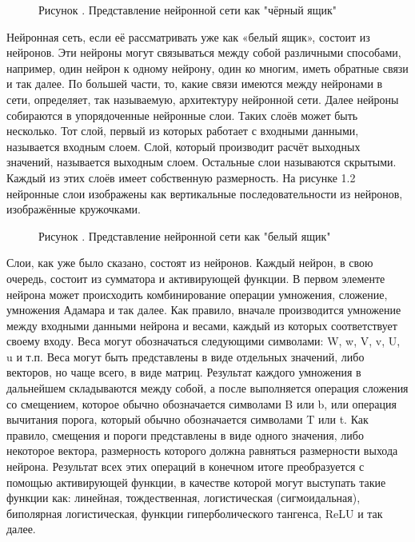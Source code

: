 {  \begin{figure}[H]
    \centering
    \def\svgwidth{\textwidth}
    
    \caption*{\gostFont Рисунок \thechaptercntr .\theimagecntr \spc {--} Представление нейронной сети как "чёрный ящик"}
    \label{fig:NNBlackBox}
  \end{figure} \addtocounter{imagecntr}{1}

  \par \redline Нейронная сеть, если её рассматривать уже как «белый ящик», состоит из нейронов. Эти нейроны могут связываться между собой различными способами, например, один нейрон к одному нейрону, один ко многим, иметь обратные связи и так далее. По большей части, то, какие связи имеются между нейронами в сети, определяет, так называемую, архитектуру нейронной сети. Далее нейроны собираются в упорядоченные нейронные слои. Таких слоёв может быть несколько. Тот слой, первый из которых работает с входными данными, называется входным слоем. Слой, который производит расчёт выходных значений, называется выходным слоем. Остальные слои называются скрытыми. Каждый из этих слоёв имеет собственную размерность. На рисунке 1.2 нейронные слои изображены как вертикальные последовательности из нейронов, изображённые кружочками.

  \begin{figure}[H]
    \centering
    \def\svgwidth{\textwidth}
    
    \caption*{\gostFont Рисунок \thechaptercntr .\theimagecntr \spc {--} Представление нейронной сети как "белый ящик"}
    \label{fig:NNWhiteBox}
  \end{figure} \addtocounter{imagecntr}{1}

  \par \redline Слои, как уже было сказано, состоят из нейронов. Каждый нейрон, в свою очередь, состоит из сумматора и активирующей функции. В первом элементе нейрона может происходить комбинирование операции умножения, сложение, умножения Адамара и так далее. Как правило, вначале производится умножение между входными данными нейрона и весами, каждый из которых соответствует своему входу. Веса могут обозначаться следующими символами: W, w, V, v, U, u и т.п. Веса могут быть представлены в виде отдельных значений, либо векторов, но чаще всего, в виде матриц. Результат каждого умножения в дальнейшем складываются между собой, а после выполняется операция сложения со смещением, которое обычно обозначается символами B или b, или операция вычитания порога, который обычно обозначается символами T или t. Как правило, смещения и пороги представлены в виде одного значения, либо некоторое вектора, размерность которого должна равняться размерности выхода нейрона.  Результат всех этих операций в конечном итоге преобразуется с помощью активирующей функции, в качестве которой могут выступать такие функции как: линейная, тождественная, логистическая (сигмоидальная), биполярная логистическая, функции гиперболического тангенса, ReLU и так далее.  

}
